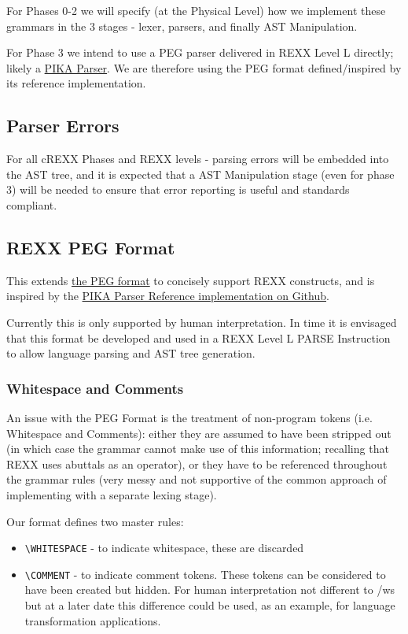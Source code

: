 For Phases 0-2 we will specify (at the Physical Level) how we implement these
grammars in the 3 stages - lexer, parsers, and finally AST Manipulation.

For Phase 3 we intend to use a PEG parser delivered in REXX Level L directly;
likely a \href{https://github.com/lukehutch/pikaparser}{PIKA Parser}. We are therefore
using the PEG format defined/inspired by its reference implementation.

\subsection{Parser Errors}

For all cREXX Phases and REXX levels - parsing errors will be embedded into the
AST tree, and it is expected that a AST Manipulation stage (even for phase 3)
will be needed to ensure that error reporting is useful and standards compliant.

\subsection{REXX PEG Format}

This extends \href{https://en.wikipedia.org/wiki/Parsing_expression_grammar}{the PEG format} to concisely support REXX constructs, and is inspired by the
\href{https://github.com/lukehutch/pikaparser}{PIKA Parser Reference implementation on Github}.

Currently this is only supported by \textquotedbl{}human interpretation\textquotedbl{}. In time it is envisaged that this format be developed and used in a REXX Level L PARSE Instruction to allow language parsing and AST tree generation.

\subsubsection{Whitespace and Comments}

An issue with the PEG Format is the treatment of non-program tokens (i.e. Whitespace and Comments): either they are assumed to have been stripped out (in which case the grammar cannot make use of this information; recalling that REXX uses abuttals as an operator), or they have to be referenced throughout the grammar rules (very messy and not supportive of the common approach of implementing with a separate lexing stage).

Our format defines two master rules:

\begin{itemize}
\item \texttt{\textbackslash{}WHITESPACE} - to indicate whitespace, these are discarded

\item \texttt{\textbackslash{}COMMENT} - to indicate comment tokens. These tokens can be considered to have been created but hidden. For human interpretation not different to /ws but at a later date this difference could be used, as an example, for language transformation applications.

\end{itemize}

